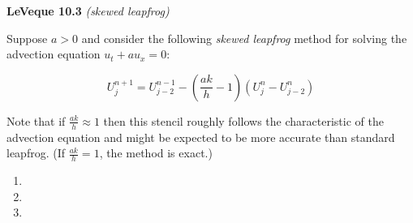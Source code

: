\textbf{LeVeque 10.3}  \textit{(skewed leapfrog)}

Suppose $a > 0$ and consider the following \textit{skewed leapfrog} method for solving the advection equation
$u_t + a u_x = 0$:

$$
U_j^{n+1} = U_{j-2}^{n-1} - \left( \frac{a k}{h} - 1 \right) \left( U_j^n - U_{j-2}^n \right)
$$

Note that if $\frac{ak}{h} \approx 1$ then this stencil roughly follows the characteristic of the advection equation
and might be expected to be more accurate than standard leapfrog. (If $\frac{ak}{h} = 1$, the method is exact.)

\begin{enumerate}
  \item 
  \pagebreak
  \item 
  \pagebreak
  \item 
\end{enumerate} 